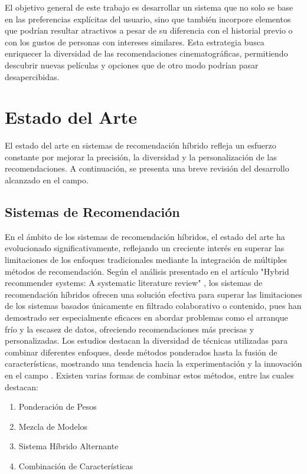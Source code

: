 \documentclass[runningheads]{llncs}
\begin{document}
El objetivo general de este trabajo es desarrollar un sistema que no solo se base en las preferencias explícitas del usuario, sino que también incorpore elementos que podrían resultar atractivos a pesar de su diferencia con el historial previo o con los gustos de personas con intereses similares. Esta estrategia busca enriquecer la diversidad de las recomendaciones cinematográficas, permitiendo descubrir nuevas películas y opciones que de otro modo podrían pasar desapercibidas.

\section{Estado del Arte}

El estado del arte en sistemas de recomendación híbrido refleja un esfuerzo constante por mejorar la precisión, la diversidad y la personalización de las recomendaciones. A continuación, se presenta una breve revisión del desarrollo alcanzado en el campo.

    \subsection{Sistemas de Recomendación}
    En el ámbito de los sistemas de recomendación híbridos, el estado del arte ha evolucionado significativamente, reflejando un creciente interés en superar las limitaciones de los enfoques tradicionales mediante la integración de múltiples métodos de recomendación. Según el análisis presentado en el artículo "Hybrid recommender systems: A systematic literature
    review" \cite{hybridRecommenderSystemReview}, los sistemas de recomendación híbridos ofrecen una solución efectiva para superar las limitaciones de los sistemas basados únicamente en filtrado colaborativo o contenido, pues han demostrado ser especialmente eficaces en abordar problemas como el arranque frío y la escasez de datos, ofreciendo recomendaciones más precisas y personalizadas. Los estudios destacan la diversidad de técnicas utilizadas para combinar diferentes enfoques, desde métodos ponderados hasta la fusión de características, mostrando una tendencia hacia la experimentación y la innovación en el campo \cite{recommendationModelsTourism} . 
    Existen varias formas de combinar estos métodos, entre las cuales destacan:
    \begin{enumerate}
        \item Ponderación de Pesos 
        \item Mezcla de Modelos
        \item Sistema Híbrido Alternante
        \item Combinación de Características
        
    \end{enumerate}
\end{document}
